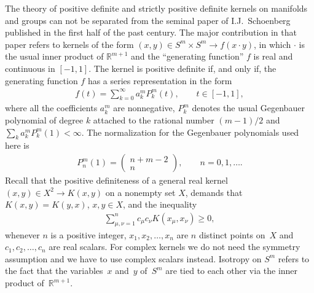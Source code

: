 \documentclass[pdftex]{sigma}
\numberwithin{equation}{section}
\begin{document}
The theory of positive def\/inite and strictly positive def\/inite kernels on manifolds and groups can not be separated from the seminal paper of I.J.~Schoenberg~\cite{schoen} published in the f\/irst half of the past century. The major contribution in that paper refers to kernels of the form $(x,y) \in S^m \times S^m \to f(x \cdot y)$, in which $\cdot$ is the usual inner product of $\mathbb{R}^{m+1}$ and the ``generating function'' $f$ is real and continuous in $[-1,1]$. The kernel is positive def\/inite if, and only if, the generating function $f$ has a series representation in the form
\begin{gather*}
f(t)=\sum_{k=0}^{\infty}a_{k}^mP_{k}^m(t),\qquad t \in [-1,1],
\end{gather*}
where all the coef\/f\/icients $a_k^m$ are nonnegative, $P_k^m$ denotes the usual Gegenbauer polynomial of degree $k$ attached to the rational number $(m-1)/2$ and $\sum_{k}a_k^m P_k^m(1)<\infty$. The normalization for the Gegenbauer polynomials used here is
\begin{gather*}
P_n^m(1)=\left(\begin{matrix} n+m-2 \\ n \end{matrix} \right),\qquad n=0,1,\ldots.
\end{gather*}
Recall that the positive def\/initeness of a general real kernel $(x,y) \in X^2 \to K(x,y)$ on a nonempty set $X$, demands that $K(x,y)=K(y,x)$, $x,y\in X$, and the inequality
\begin{gather*} \sum_{\mu,\nu=1}^nc_\mu c_\nu K(x_\mu , x_\nu)\geq 0,
\end{gather*}
whenever $n$ is a positive integer, $x_1, x_2, \ldots, x_n$ are $n$ distinct points on~$X$ and $c_1, c_2, \ldots, c_n$ are real scalars. For complex kernels we do not need the symmetry assumption and we have to use complex scalars instead. Isotropy on $S^m$ refers to the fact that the variables~$x$ and~$y$ of~$S^m$ are tied to each other via the inner product of~$\mathbb{R}^{m+1}$.
\end{document}
